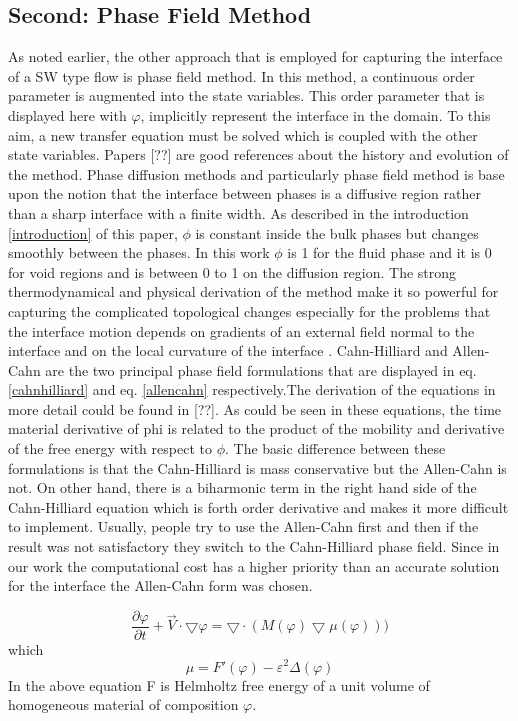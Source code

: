 \documentclass[letterpaper,10pt]{article}
\begin{document}
\subsection{Second: Phase Field Method} \label{phase field}
As noted earlier, the other approach that is employed 
for capturing the interface of a SW type flow is phase field method.
In this method, a continuous
order parameter is augmented into the state variables. This order parameter that is displayed here with $\varphi$, 
implicitly represent the interface in the domain. To this aim, a new transfer equation 
must be solved which is coupled with the other state variables.
Papers [??] are good references about the history and evolution of the method.
Phase diffusion methods and particularly phase field method is base upon the notion that the interface between phases is a 
diffusive region rather than a sharp interface with a finite width. 
As described in the introduction \ref{introduction} of this paper, $\phi$ is constant inside the bulk phases but changes 
smoothly between the phases. In this work $\phi$ is 1 for the fluid phase and it is 0 for void regions and is between 0 to 1 on 
the diffusion region.
The strong thermodynamical and physical derivation of the method make it so powerful for capturing the complicated 
topological changes especially for the problems that the interface motion depends on gradients of an external field normal 
to the interface and on the local curvature of the interface \cite{Beckermann2006}.
Cahn-Hilliard and Allen-Cahn are the two principal phase field formulations that 
are displayed in eq. \eqref{cahnhilliard} and eq. \eqref{allencahn} respectively.The derivation of the equations in more detail could be 
found in [??]. As could be seen in these equations, the time material derivative of phi is related to the product of the 
mobility and derivative of the free energy with respect to $\phi$. The basic difference between these formulations is that the 
Cahn-Hilliard is mass conservative but the Allen-Cahn is not. On other hand, there is a biharmonic term in the right hand side of 
the Cahn-Hilliard equation which is forth order derivative and makes it more difficult to implement. Usually, people try to 
use the Allen-Cahn first and then if the result was not satisfactory they switch to the Cahn-Hilliard phase field. 
Since in our work the computational cost has a higher priority than an accurate solution for the interface the Allen-Cahn 
form was chosen.

\begin{equation}
 \label{cahnhilliard}
\frac{\partial \varphi }{\partial t} + \overrightarrow{V} \cdot \bigtriangledown \varphi = 
\bigtriangledown \cdot (M(\varphi) \bigtriangledown\mu(\varphi)))
\end{equation}
which \newline
\begin{equation}
\mu = F'(\varphi)- \varepsilon^2 \Delta (\varphi)
\end{equation}
In the above equation F is Helmholtz free energy of a unit volume of homogeneous material of composition $\varphi$. 
\end{document}
